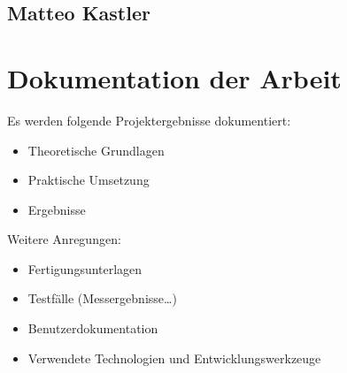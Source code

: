 \subsection{Matteo Kastler}

\section{Dokumentation der Arbeit}

Es werden folgende Projektergebnisse dokumentiert:

\begin{itemize}
	\item Theoretische Grundlagen
	\item Praktische Umsetzung
	\item Ergebnisse
\end{itemize}

Weitere Anregungen:

\begin{itemize}
	\item Fertigungsunterlagen
	\item Testfälle (Messergebnisse…)
	\item Benutzerdokumentation
	\item Verwendete Technologien und Entwicklungswerkzeuge
\end{itemize}

